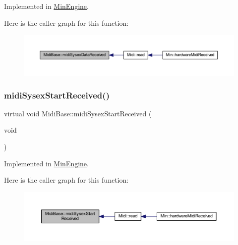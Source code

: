 Implemented in \hyperlink{class_min_engine_ac424a71b7b8e28ce4e6cd47bda488704}{Min\+Engine}.

Here is the caller graph for this function\+:
\nopagebreak
\begin{figure}[H]
\begin{center}
\leavevmode
\includegraphics[width=350pt]{de/def/class_midi_base_ade00871c0c9e32bfacf34480faf0d37b_icgraph}
\end{center}
\end{figure}
\mbox{\label{class_midi_base_a3b3e70e61a2f2fa169bf694eeefeb0fd}} 
\subsubsection{\texorpdfstring{midi\+Sysex\+Start\+Received()}{midiSysexStartReceived()}}
{\footnotesize\ttfamily virtual void Midi\+Base\+::midi\+Sysex\+Start\+Received (\begin{DoxyParamCaption}\item[{void}]{ }\end{DoxyParamCaption})\hspace{0.3cm}{\ttfamily [pure virtual]}}



Implemented in \hyperlink{class_min_engine_a79e4c141d7f6df522e5307195c8aeec0}{Min\+Engine}.

Here is the caller graph for this function\+:
\nopagebreak
\begin{figure}[H]
\begin{center}
\leavevmode
\includegraphics[width=350pt]{de/def/class_midi_base_a3b3e70e61a2f2fa169bf694eeefeb0fd_icgraph}
\end{center}
\end{figure}
\mbox{\label{class_midi_base_a14d11f47e731a26535f855a99893d092}} 
